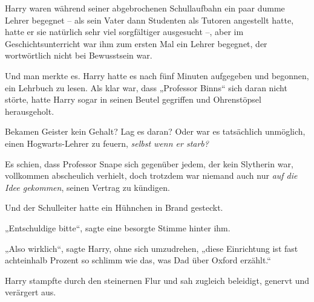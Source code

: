 Harry waren während seiner abgebrochenen Schullaufbahn ein paar dumme Lehrer begegnet – als sein Vater dann Studenten als Tutoren angestellt hatte, hatte er sie natürlich sehr viel sorgfältiger ausgesucht –, aber im Geschichtsunterricht war ihm zum ersten Mal ein Lehrer begegnet, der wortwörtlich nicht bei Bewusstsein war. 

Und man merkte es. Harry hatte es nach fünf Minuten aufgegeben und begonnen, ein Lehrbuch zu lesen. Als klar war, dass „Professor Binns“ sich daran nicht störte, hatte Harry sogar in seinen Beutel gegriffen und Ohrenstöpsel herausgeholt. 

Bekamen Geister kein Gehalt? Lag es daran? Oder war es tatsächlich unmöglich, einen Hogwarts-Lehrer zu feuern, \emph{selbst wenn er starb?} 

Es schien, dass Professor Snape sich gegenüber jedem, der kein Slytherin war, vollkommen abscheulich verhielt, doch trotzdem war niemand auch nur \emph{auf die Idee gekommen}, seinen Vertrag zu kündigen. 

Und der Schulleiter hatte ein Hühnchen in Brand gesteckt. 

„Entschuldige bitte“, sagte eine besorgte Stimme hinter ihm. 

„Also wirklich“, sagte Harry, ohne sich umzudrehen, „diese Einrichtung ist fast achteinhalb Prozent so schlimm wie das, was Dad über Oxford erzählt.“ 

\later

Harry stampfte durch den steinernen Flur und sah zugleich beleidigt, genervt und verärgert aus. 

